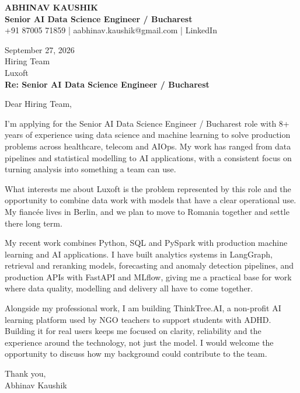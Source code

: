 \documentclass[10pt,a4paper]{article}
\begin{document}
\begin{center}
{\Large\bfseries ABHINAV KAUSHIK}\\[2pt]
{\bfseries Senior AI Data Science Engineer / Bucharest}\\[2pt]
+91 87005 71859 \quad | \quad aabhinav.kaushik@gmail.com \quad | \quad LinkedIn
\end{center}
\vspace{8pt}
September 27, 2026\\[6pt]
Hiring Team\\
Luxoft\\[4pt]
\textbf{Re: Senior AI Data Science Engineer / Bucharest}

Dear Hiring Team,

I’m applying for the Senior AI Data Science Engineer / Bucharest role with 8+ years of experience using data science and machine learning to solve production problems across healthcare, telecom and AIOps. My work has ranged from data pipelines and statistical modelling to AI applications, with a consistent focus on turning analysis into something a team can use.

What interests me about Luxoft is the problem represented by this role and the opportunity to combine data work with models that have a clear operational use. My fiancée lives in Berlin, and we plan to move to Romania together and settle there long term.

My recent work combines Python, SQL and PySpark with production machine learning and AI applications. I have built analytics systems in LangGraph, retrieval and reranking models, forecasting and anomaly detection pipelines, and production APIs with FastAPI and MLflow, giving me a practical base for work where data quality, modelling and delivery all have to come together.

Alongside my professional work, I am building ThinkTree.AI, a non-profit AI learning platform used by NGO teachers to support students with ADHD. Building it for real users keeps me focused on clarity, reliability and the experience around the technology, not just the model. I would welcome the opportunity to discuss how my background could contribute to the team.

Thank you,\\
Abhinav Kaushik
\end{document}
